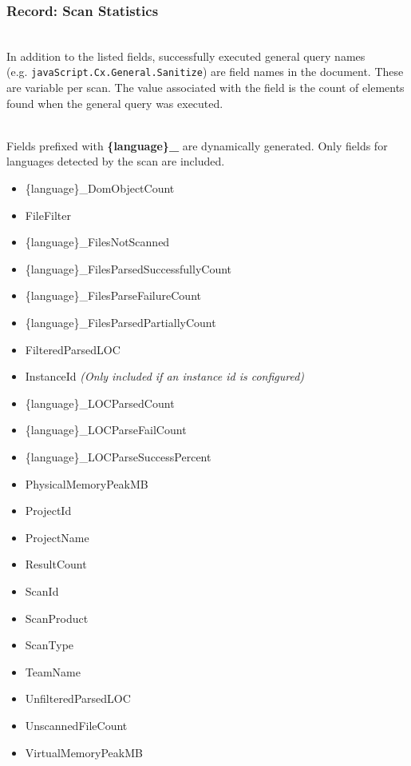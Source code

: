 \subsubsection{Record: Scan Statistics}

\noindent\\In addition to the listed fields, successfully executed general query names \\
(e.g. \texttt{javaScript.Cx.General.Sanitize}) are field names in the 
document.  These are variable per scan.  The value associated with the field is the count of elements found when the general query was executed.

\noindent\\Fields prefixed with \textbf{\{language\}\_} are dynamically generated.  Only fields for languages detected by the scan are included.

\begin{itemize}
    \item \{language\}\_DomObjectCount
    \item FileFilter
    \item \{language\}\_FilesNotScanned
    \item \{language\}\_FilesParsedSuccessfullyCount
    \item \{language\}\_FilesParseFailureCount
    \item \{language\}\_FilesParsedPartiallyCount
    \item FilteredParsedLOC
    \item InstanceId \textit{(Only included if an instance id is configured)}
    \item \{language\}\_LOCParsedCount
    \item \{language\}\_LOCParseFailCount
    \item \{language\}\_LOCParseSuccessPercent
    \item PhysicalMemoryPeakMB
    \item ProjectId
    \item ProjectName
    \item ResultCount
    \item ScanId
    \item ScanProduct
    \item ScanType
    \item TeamName
    \item UnfilteredParsedLOC
    \item UnscannedFileCount
    \item VirtualMemoryPeakMB
\end{itemize}
